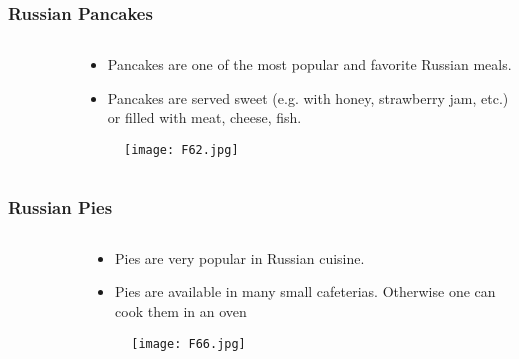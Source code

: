 \documentclass[pdflatex,compress,8pt,
	xcolor={dvipsnames,dvipsnames,svgnames,x11names,table},
	hyperref={colorlinks = true,breaklinks = true, urlcolor = NavyBlue, breaklinks = true}]{beamer}
\begin{document}
\begin{frame}\frametitle{Russian Pancakes}
\begin{minipage}[0.4\textheight]{\textwidth}
\begin{columns}[T]
\begin{column}{0.5\textwidth}
\begin{figure}[H]
	\centering
			\vspace{1mm}
\end{figure}
\end{column}
\begin{column}{0.5\textwidth}
\begin{itemize}
	\item Pancakes are one of the most popular and favorite Russian meals.
	\item Pancakes are served sweet (e.g. with honey, strawberry jam, etc.) or filled with meat, cheese, fish.
\end{itemize}
\begin{figure}[H]
	\centering
		\texttt{[image: F62.jpg]}
\end{figure}
\end{column}
\end{columns}
\end{minipage}
\end{frame}

\begin{frame}\frametitle{Russian Pies}
\begin{minipage}[0.4\textheight]{\textwidth}
\begin{columns}[T]
\begin{column}{0.5\textwidth}
\begin{figure}[H]
	\centering
			\vspace{1mm}
\end{figure}
\end{column}
\begin{column}{0.5\textwidth}
\vspace{2em} 
\begin{itemize}
	\item Pies are very popular in Russian cuisine.
	\item Pies are available in many small cafeterias. Otherwise one can cook them in an oven
\end{itemize}
\begin{figure}[H]
	\centering
		\texttt{[image: F66.jpg]}
\end{figure}
\end{column}
\end{columns}
\end{minipage}
\end{frame}
\end{document}

